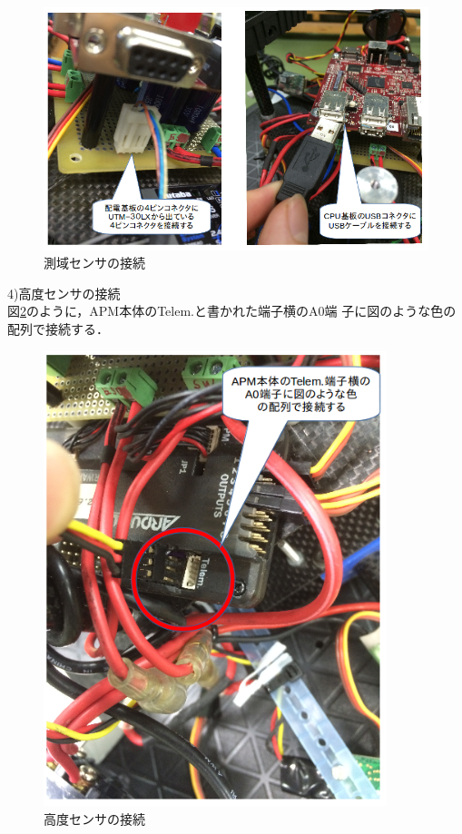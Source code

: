 \documentclass[12pt,oneside]{sotsuken_paper}
\begin{document}
\begin{figure}[H]
\begin{center}
\includegraphics[width=140mm]{img/setuzoku8.png}
\end{center}
\caption{測域センサの接続}
\label{fig:setuzoku8}
\end{figure}

4)高度センサの接続\\
  図\ref{fig:setuzoku9}のように，APM本体のTelem.と書かれた端子横のA0端 子に図のような色の配列で接続する．\\

\begin{figure}[H]
\begin{center}
\includegraphics[width=100mm]{img/setuzoku9.png}
\end{center}
\caption{高度センサの接続}
\label{fig:setuzoku9}
\end{figure}
\end{document}
